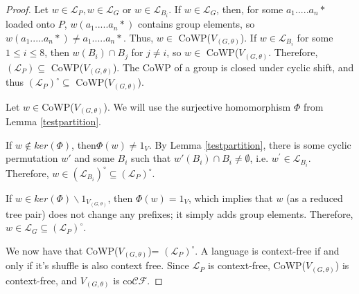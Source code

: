 \documentclass[11pt]{amsart}
\theoremstyle{plain}
\theoremstyle{remark}
\theoremstyle{definition}
\theoremstyle{remark}
\theoremstyle{named}
\begin{document}
\begin{proof}
Let $w \in \mathcal{L}_P, w \in  \mathcal{L}_G$ or $w \in \mathcal{L}_{B_{i}}$. If $w \in \mathcal{L}_G$, then, for some $a_1.....a_n*$ loaded onto $P$, $w(a_1.....a_n*)$ contains group elements, so $w(a_1.....a_n*) \not= a_1.....a_n*$. Thus, $w \in $ CoWP($V_{(G, \theta)}$). If $w \in \mathcal{L}_{B_{i}}$ for some $1\leq i\leq8$, then $w(B_i) \cap B_j$ for $j\not= i$, so $w \in $ CoWP($V_{(G, \theta)}$. Therefore, $(\mathcal{L}_P) \subseteq$ CoWP($V_{(G, \theta)}$). The CoWP of a group is closed under cyclic shift, and thus $(\mathcal{L}_P)^{\circ} \subseteq$ CoWP($V_{(G, \theta)}$).




Let $w \in $CoWP($V_{(G, \theta)}$). We will use the surjective homomorphism $\Phi$ from Lemma \ref{testpartition}.


If $w \notin ker(\Phi)$, then$\Phi(w) \not=1_V$. By Lemma \ref{testpartition}, there is some cyclic permutation $w'$ and some $B_i$ such that $w' (B_i) \cap B_i \not= \emptyset$, i.e. $w^{\prime} \in \mathcal{L}_{B_i}$. Therefore, $w \in (\mathcal{L}_{B_i})^{\circ}\subseteq (\mathcal{L}_P)^{\circ}$.


If $w \in ker(\Phi)\backslash 1_{V_{(G,\theta)}}$, then $\Phi(w)={1_V}$, which implies that $w$ (as a reduced tree pair) does not change any prefixes; it simply adds group elements. Therefore, $w\in{\mathcal{L}_G}\subseteq (\mathcal{L}_P)^{\circ}$.

We now have that CoWP($V_{(G, \theta)}$)= $(\mathcal{L}_P)^{\circ}$. A language is context-free if and only if it's shuffle is also context free. Since $\mathcal{L}_P$ is context-free, CoWP($V_{(G, \theta)}$) is context-free, and $V_{(G, \theta)}$ is co$\mathcal{CF}$. 

\end{proof}
\end{document}
